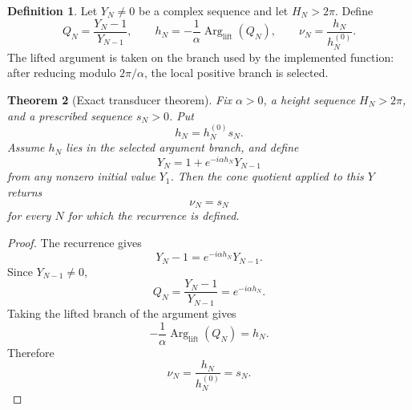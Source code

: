 \documentclass[11pt]{amsart}
\numberwithin{equation}{section}
\theoremstyle{plain}
\newtheorem{theorem}{Theorem}[section]
\theoremstyle{definition}
\newtheorem{definition}[theorem]{Definition}
\theoremstyle{remark}
\begin{document}
\begin{definition}
\label{def:cone_quotient}
Let $Y_N\neq0$ be a complex sequence and let $H_N>2\pi$. Define
\begin{equation}
Q_N=\frac{Y_N-1}{Y_{N-1}},
\qquad
h_N=-\frac{1}{\alpha}\operatorname{Arg}_{\mathrm{lift}}(Q_N),
\qquad
\nu_N=\frac{h_N}{h_N^{(0)}}.
\label{eq:cone_quotient}
\end{equation}
The lifted argument is taken on the branch used by the implemented function: after reducing modulo $2\pi/\alpha$, the local positive branch is selected.
\end{definition}

\begin{theorem}[Exact transducer theorem]
\label{thm:exact_transducer}
Fix $\alpha>0$, a height sequence $H_N>2\pi$, and a prescribed sequence $s_N>0$. Put
\begin{equation}
h_N=h_N^{(0)}s_N.
\label{eq:prescribed_gap}
\end{equation}
Assume $h_N$ lies in the selected argument branch, and define
\begin{equation}
Y_N=1+e^{-i\alpha h_N}Y_{N-1}
\label{eq:transducer_recurrence}
\end{equation}
from any nonzero initial value $Y_1$. Then the cone quotient applied to this $Y$ returns
\begin{equation}
\nu_N=s_N
\label{eq:exact_output}
\end{equation}
for every $N$ for which the recurrence is defined.
\end{theorem}

\begin{proof}
The recurrence gives
\begin{equation}
Y_N-1=e^{-i\alpha h_N}Y_{N-1}.
\label{eq:recurrence_difference}
\end{equation}
Since $Y_{N-1}\neq0$,
\begin{equation}
Q_N=\frac{Y_N-1}{Y_{N-1}}=e^{-i\alpha h_N}.
\label{eq:quotient_phase}
\end{equation}
Taking the lifted branch of the argument gives
\begin{equation}
-\frac{1}{\alpha}\operatorname{Arg}_{\mathrm{lift}}(Q_N)=h_N.
\label{eq:lifted_argument_recovers_gap}
\end{equation}
Therefore
\begin{equation}
\nu_N=\frac{h_N}{h_N^{(0)}}=s_N.
\label{eq:normalized_gap_recovers_input}
\end{equation}
\end{proof}
\end{document}
